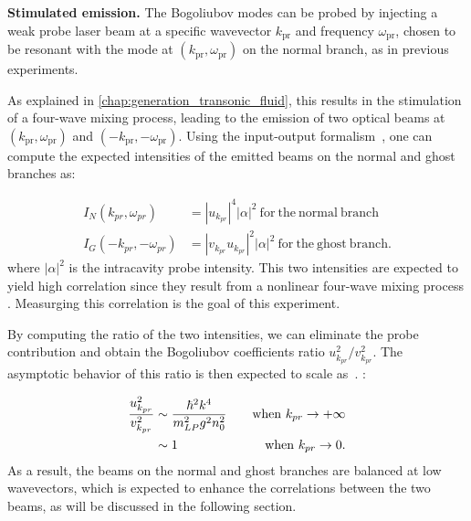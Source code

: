 \bigskip

\textbf{Stimulated emission.} The Bogoliubov modes can be probed by injecting a weak probe laser beam at a specific wavevector $k_{\mathrm{pr}}$ and frequency $\omega_{\mathrm{pr}}$, chosen to be resonant with the mode at $(k_{\mathrm{pr}}, \omega_{\mathrm{pr}})$ on the normal branch, as in previous experiments. 

As explained in \autoref{chap:generation_transonic_fluid}, this results in the stimulation of a four-wave mixing process, leading to the emission of two optical beams at $(k_{\mathrm{pr}}, \omega_{\mathrm{pr}})$ and $(-k_{\mathrm{pr}}, -\omega_{\mathrm{pr}})$. 
Using the input-output formalism~\cite{I_frerot_PRX_2023}, one can compute the expected intensities of the emitted beams on the normal and ghost branches as:


\begin{equation}
    \label{eq:uv_intensity2}
    \begin{aligned}
    I_N(k_{pr},\omega_{pr}) &= |u_{k_{pr}}|^4 |\alpha|^2  \  \mathrm{for \ the \ normal \ branch } \\
    I_G(-k_{pr},-\omega_{pr}) &= |v_{k_{pr}}u_{k_{pr}}|^2 |\alpha|^2 \ \mathrm{ for \ the \ ghost \  branch.}
    \end{aligned}
\end{equation}
where $|\alpha|^2$ is the intracavity probe intensity. This two intensities are expected to yield high correlation since they result from a nonlinear four-wave mixing process \cite{glorieux_quantum_2011,romanelli_4wm_2007}. Measurging this correlation is the goal of this experiment.

By computing the ratio of the two intensities, we can eliminate the probe contribution and obtain the Bogoliubov coefficients ratio $u_{k_{pr}}^2/v_{k_{pr}}^2$. 
The asymptotic behavior of this ratio is then expected to scale as~\cite{castin_bose-einstein_2001}. :

\begin{equation}
    \begin{aligned}
    \dfrac{u_{k_{pr}}^2}{v_{k_{pr}}^2} & \sim \dfrac{\hbar^2k^4}{m_{LP}^2g^2n_0^2} \  \ \ &\mathrm{when} \ k_{pr} \to +\infty \\
    &\sim 1 \ \ &\mathrm{ when} \ k_{pr} \to 0.
    \end{aligned}
\end{equation}
As a result, the beams on the normal and ghost branches are balanced at low wavevectors, which is expected to enhance the correlations between the two beams, as will be discussed in the following section.


